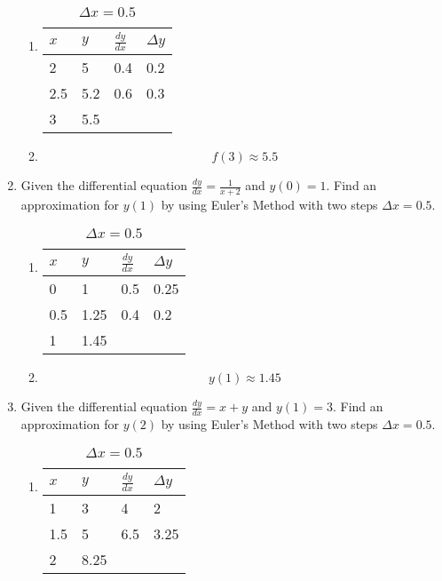 \documentclass[12pt]{article}
\begin{document}
\begin{enumerate}
\begin{enumerate}
    \item 

\begin{table}[h]
\caption{$\Delta x = 0.5$}
\centering \label{table_example}
\begin{tabular}{l|lll}
$x$ & \multicolumn{1}{l|}{$y$} & \multicolumn{1}{l|}{$\frac{dy}{dx}$} & $\Delta y$ \\ \hline
2 & 5 & 0.4 & 0.2 \\
2.5 & 5.2 & 0.6 & 0.3 \\
3 & 5.5 &  & 
\end{tabular}
\end{table}


\item $$f(3)\approx 5.5$$
\end{enumerate}


\item  Given the differential equation $\frac{dy}{dx}=\frac{1}{x+2}$ and $y(0)=1$. Find an approximation for $y(1)$ by using Euler's Method with two steps $\Delta x =0.5$. 
\begin{enumerate}
    \item 
\begin{table}[h]
\caption{$\Delta x = 0.5$}
\centering \label{table_example}
\begin{tabular}{l|lll}
$x$ & \multicolumn{1}{l|}{$y$} & \multicolumn{1}{l|}{$\frac{dy}{dx}$} & $\Delta y$ \\ \hline
0 & 1 & 0.5 & 0.25 \\
0.5 & 1.25 & 0.4 & 0.2 \\
1 & 1.45 &  & 
\end{tabular}
\end{table}
\item $$y(1)\approx 1.45$$
\end{enumerate}
\item  Given the differential equation $\frac{dy}{dx}=x+y$ and $y(1)=3$. Find an approximation for $y(2)$ by using Euler's Method with two steps $\Delta x =0.5$. 
\begin{enumerate}
    \item 

\begin{table}[h]
\caption{$\Delta x = 0.5$}
\centering \label{table_example}

\begin{tabular}{l|lll}
$x$ & \multicolumn{1}{l|}{$y$} & \multicolumn{1}{l|}{$\frac{dy}{dx}$} & $\Delta y$ \\ \hline
1 & 3 & 4 & 2 \\
1.5 & 5 & 6.5 & 3.25 \\
2 & 8.25 &  & 
\end{tabular}


\end{table}
\end{enumerate}
\end{enumerate}
\end{document}
